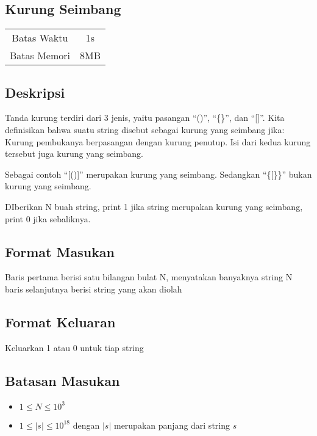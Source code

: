 \documentclass{article}
\begin{document}
\begin{center}
    \section*{Kurung Seimbang} %

    \begin{tabular}{ | c c | }
        \hline
        Batas Waktu  & 1s \\    %
        Batas Memori & 8MB \\  %
        \hline
    \end{tabular}
\end{center}

\subsection*{Deskripsi}
Tanda kurung terdiri dari 3 jenis, yaitu pasangan “()”, “\{\}”, dan “[]”. Kita definisikan bahwa suatu string disebut sebagai kurung yang seimbang jika:
Kurung pembukanya berpasangan dengan kurung penutup.
Isi dari kedua kurung tersebut juga kurung yang seimbang.

Sebagai contoh “[()]” merupakan kurung yang seimbang. Sedangkan “\{[\}\}” bukan kurung yang seimbang.

DIberikan N buah string, print 1 jika string merupakan kurung yang seimbang, print 0 jika sebaliknya.


\subsection*{Format Masukan}
Baris pertama berisi satu bilangan bulat N, menyatakan banyaknya string
N baris selanjutnya berisi string yang akan diolah



\subsection*{Format Keluaran}
Keluarkan 1 atau 0 untuk tiap string
\subsection*{Batasan Masukan}
\begin{itemize}
 \item $1 \leq N  \leq 10^3$
 \item $1 \leq |s|  \leq 10^{18}$ dengan $|s|$ merupakan panjang dari string $s$
\end{itemize}
\end{document}
